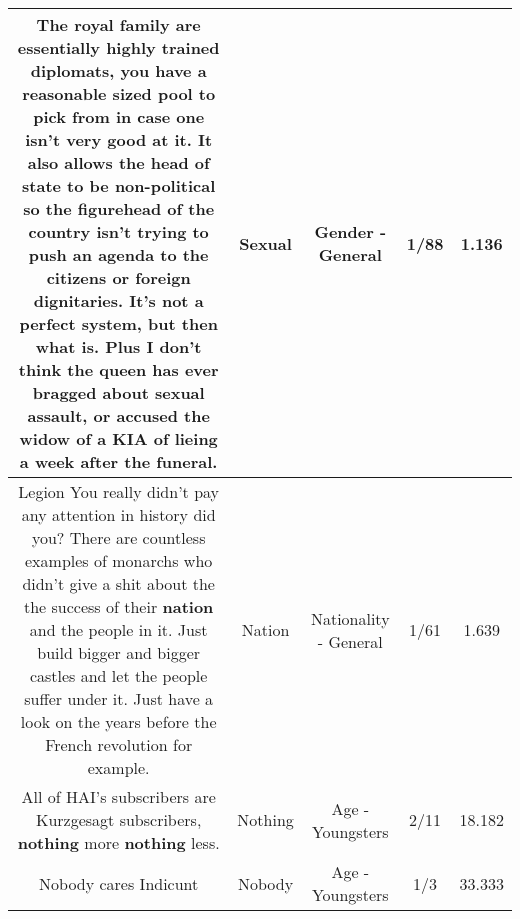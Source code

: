 \documentclass[11pt]{article}
\newlength\mylength
\begin{document}
\begin{center}
\begin{longtable}{|C{.65\mylength}|C{.30\mylength}|C{.12\mylength}|C{.12\mylength}|C{.12\mylength}|}
  \small The royal family are essentially highly trained diplomats, you have a reasonable sized pool to pick from in case one isn't very good at it.  It also allows the head of state to be non-political so the figurehead of the country isn't trying to push an agenda to the citizens or foreign dignitaries.  It's not a perfect system, but then what is.  Plus I don't think the queen has ever bragged about \textbf{sexual} assault, or accused the widow of a KIA of lieing a week after the funeral.\normalsize   & Sexual & Gender - General & 1/88 & 1.136 \\  \hline
  \small Legion   You really didn't pay any attention in history did you? There are countless examples of monarchs who didn't give a shit about the the success of their \textbf{nation} and the people in it. Just build bigger and bigger castles and let the people suffer under it. Just have a look on the years before the French revolution for example.\normalsize   & Nation & Nationality - General & 1/61 & 1.639 \\  \hline
  \small All of HAI's subscribers are Kurzgesagt subscribers, \textbf{nothing} more \textbf{nothing} less.\normalsize   & Nothing & Age - Youngsters & 2/11 & 18.182 \\  \hline
  \small Nobody cares Indicunt\normalsize   & Nobody & Age - Youngsters & 1/3 & 33.333 \\  \hline
  
\end{longtable}
\end{center}
\end{document}
